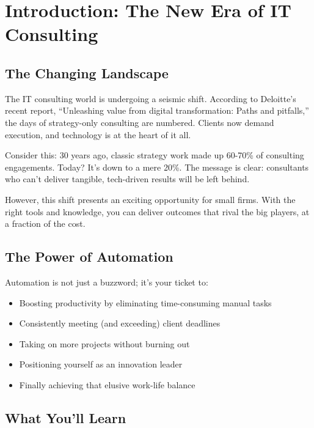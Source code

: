 \chapter{Introduction: The New Era of IT Consulting}

\section{The Changing Landscape}

The IT consulting world is undergoing a seismic shift. According to Deloitte's recent report, ``Unleashing value from digital transformation: Paths and pitfalls,'' the days of strategy-only consulting are numbered. Clients now demand execution, and technology is at the heart of it all.

\begin{importantbox}
Consider this: 30 years ago, classic strategy work made up 60-70\% of consulting engagements. Today? It's down to a mere 20\%. The message is clear: consultants who can't deliver tangible, tech-driven results will be left behind.
\end{importantbox}

However, this shift presents an exciting opportunity for small firms. With the right tools and knowledge, you can deliver outcomes that rival the big players, at a fraction of the cost.


\section{The Power of Automation}

Automation is not just a buzzword; it's your ticket to:

\begin{itemize}
    \item Boosting productivity by eliminating time-consuming manual tasks
    \item Consistently meeting (and exceeding) client deadlines
    \item Taking on more projects without burning out
    \item Positioning yourself as an innovation leader
    \item Finally achieving that elusive work-life balance
\end{itemize}

\section{What You'll Learn}


